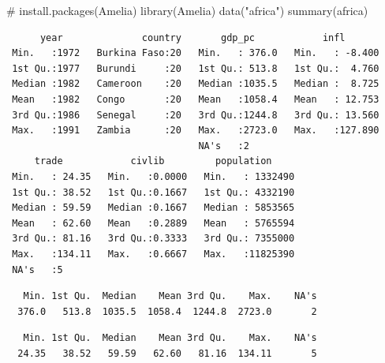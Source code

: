 \documentclass[
  letterpaper,
  DIV=11,
  numbers=noendperiod]{scrreprt}
\newenvironment{Shaded}{\begin{snugshade}}{\end{snugshade}}
\newcommand{\CommentTok}[1]{\textcolor[rgb]{0.37,0.37,0.37}{#1}}
\newcommand{\FunctionTok}[1]{\textcolor[rgb]{0.28,0.35,0.67}{#1}}
\newcommand{\NormalTok}[1]{\textcolor[rgb]{0.00,0.23,0.31}{#1}}
\newcommand{\SpecialCharTok}[1]{\textcolor[rgb]{0.37,0.37,0.37}{#1}}
\newcommand{\StringTok}[1]{\textcolor[rgb]{0.13,0.47,0.30}{#1}}
\begin{document}
\begin{Shaded}
\begin{Highlighting}[]
\CommentTok{\# install.packages(\textquotesingle{}Amelia\textquotesingle{})}
\FunctionTok{library}\NormalTok{(Amelia)}
\FunctionTok{data}\NormalTok{(}\StringTok{"africa"}\NormalTok{)}
\FunctionTok{summary}\NormalTok{(africa)}
\end{Highlighting}
\end{Shaded}

\begin{verbatim}
      year              country       gdp_pc            infl        
 Min.   :1972   Burkina Faso:20   Min.   : 376.0   Min.   : -8.400  
 1st Qu.:1977   Burundi     :20   1st Qu.: 513.8   1st Qu.:  4.760  
 Median :1982   Cameroon    :20   Median :1035.5   Median :  8.725  
 Mean   :1982   Congo       :20   Mean   :1058.4   Mean   : 12.753  
 3rd Qu.:1986   Senegal     :20   3rd Qu.:1244.8   3rd Qu.: 13.560  
 Max.   :1991   Zambia      :20   Max.   :2723.0   Max.   :127.890  
                                  NA's   :2                         
     trade            civlib         population      
 Min.   : 24.35   Min.   :0.0000   Min.   : 1332490  
 1st Qu.: 38.52   1st Qu.:0.1667   1st Qu.: 4332190  
 Median : 59.59   Median :0.1667   Median : 5853565  
 Mean   : 62.60   Mean   :0.2889   Mean   : 5765594  
 3rd Qu.: 81.16   3rd Qu.:0.3333   3rd Qu.: 7355000  
 Max.   :134.11   Max.   :0.6667   Max.   :11825390  
 NA's   :5                                           
\end{verbatim}

\begin{Shaded}
\end{Shaded}

\begin{verbatim}
   Min. 1st Qu.  Median    Mean 3rd Qu.    Max.    NA's 
  376.0   513.8  1035.5  1058.4  1244.8  2723.0       2 
\end{verbatim}

\begin{Shaded}
\end{Shaded}

\begin{verbatim}
   Min. 1st Qu.  Median    Mean 3rd Qu.    Max.    NA's 
  24.35   38.52   59.59   62.60   81.16  134.11       5 
\end{verbatim}
\end{document}
